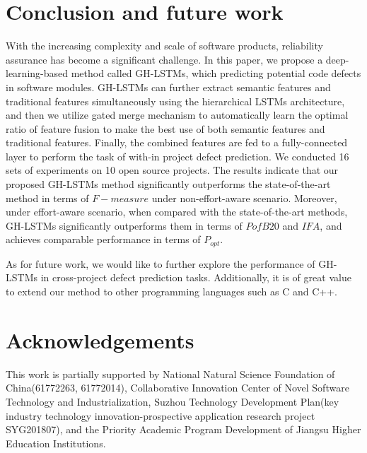 \documentclass[journal]{IEEEtran}
\begin{document}

\section{Conclusion and future work}
With the increasing complexity and scale of software products, reliability assurance has become a significant challenge. In this paper, we propose a deep-learning-based method called GH-LSTMs, which predicting potential code defects in software modules. GH-LSTMs can further extract semantic features and traditional features simultaneously using the hierarchical LSTMs architecture, and then we utilize gated merge mechanism to automatically learn the optimal ratio of feature fusion to make the best use of both semantic features and traditional features. Finally, the combined features are fed to a fully-connected layer to perform the task of with-in project defect prediction. We conducted 16 sets of experiments on 10 open source projects. The results indicate that our proposed GH-LSTMs method significantly outperforms the state-of-the-art method in terms of $F-measure$ under non-effort-aware scenario. Moreover, under effort-aware scenario, when compared with the state-of-the-art methods, GH-LSTMs significantly outperforms them in terms of $PofB20$ and $IFA$, and achieves comparable performance in terms of $P_{opt}$.

As for future work, we would like to further explore the performance of GH-LSTMs in cross-project defect prediction tasks. Additionally, it is of great value to extend our method to other programming languages such as C and C++.



\section*{Acknowledgements}

This work is partially supported by National Natural Science Foundation of China(61772263, 61772014), Collaborative Innovation Center of Novel Software Technology and Industrialization, Suzhou Technology Development Plan(key industry technology innovation-prospective application research project SYG201807), and the Priority Academic Program Development of Jiangsu Higher Education Institutions.
\end{document}
